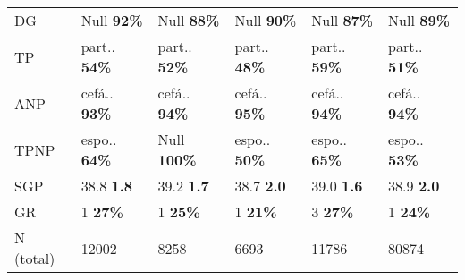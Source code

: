 \begin{tabular}{l|lllll}
       DG &   Null \textbf{92\%} &   Null \textbf{88\%} &   Null \textbf{90\%} &   Null \textbf{87\%} &   Null \textbf{89\%} \\
       TP & part.. \textbf{54\%} & part.. \textbf{52\%} & part.. \textbf{48\%} & part.. \textbf{59\%} & part.. \textbf{51\%} \\
      ANP & cefá.. \textbf{93\%} & cefá.. \textbf{94\%} & cefá.. \textbf{95\%} & cefá.. \textbf{94\%} & cefá.. \textbf{94\%} \\
     TPNP & espo.. \textbf{64\%} &  Null \textbf{100\%} & espo.. \textbf{50\%} & espo.. \textbf{65\%} & espo.. \textbf{53\%} \\
      SGP &    38.8 \textbf{1.8} &    39.2 \textbf{1.7} &    38.7 \textbf{2.0} &    39.0 \textbf{1.6} &    38.9 \textbf{2.0} \\
       GR &      1 \textbf{27\%} &      1 \textbf{25\%} &      1 \textbf{21\%} &      3 \textbf{27\%} &      1 \textbf{24\%} \\
       \midrule
N (total) &                12002 &                 8258 &                 6693 &                11786 &                80874 \\
\bottomrule
\end{tabular}
